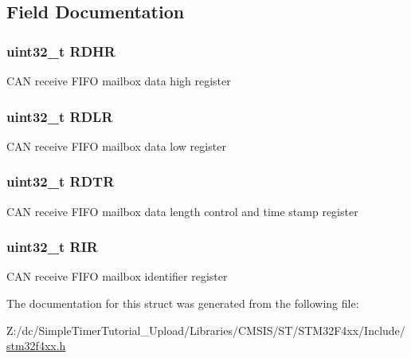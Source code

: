 \subsection{Field Documentation}
\hypertarget{struct_c_a_n___f_i_f_o_mail_box___type_def_a7f11f42ba9d3bc5cd4a4f5ea0214608e}{
\subsubsection[{R\-D\-H\-R}]{ uint32\-\_\-t R\-D\-H\-R}}\label{struct_c_a_n___f_i_f_o_mail_box___type_def_a7f11f42ba9d3bc5cd4a4f5ea0214608e}
C\-A\-N receive F\-I\-F\-O mailbox data high register \hypertarget{struct_c_a_n___f_i_f_o_mail_box___type_def_ae1c569688eedd49219cd505b9c22121b}{
\subsubsection[{R\-D\-L\-R}]{ uint32\-\_\-t R\-D\-L\-R}}\label{struct_c_a_n___f_i_f_o_mail_box___type_def_ae1c569688eedd49219cd505b9c22121b}
C\-A\-N receive F\-I\-F\-O mailbox data low register \hypertarget{struct_c_a_n___f_i_f_o_mail_box___type_def_a9563d8a88d0db403b8357331bea83a2e}{
\subsubsection[{R\-D\-T\-R}]{ uint32\-\_\-t R\-D\-T\-R}}\label{struct_c_a_n___f_i_f_o_mail_box___type_def_a9563d8a88d0db403b8357331bea83a2e}
C\-A\-N receive F\-I\-F\-O mailbox data length control and time stamp register \hypertarget{struct_c_a_n___f_i_f_o_mail_box___type_def_a0acc8eb90b17bef5b9e03c7ddaacfb0b}{
\subsubsection[{R\-I\-R}]{ uint32\-\_\-t R\-I\-R}}\label{struct_c_a_n___f_i_f_o_mail_box___type_def_a0acc8eb90b17bef5b9e03c7ddaacfb0b}
C\-A\-N receive F\-I\-F\-O mailbox identifier register 

The documentation for this struct was generated from the following file\-:\begin{DoxyCompactItemize}
\item 
Z\-:/dc/\-Simple\-Timer\-Tutorial\-\_\-\-Upload/\-Libraries/\-C\-M\-S\-I\-S/\-S\-T/\-S\-T\-M32\-F4xx/\-Include/\hyperlink{stm32f4xx_8h}{stm32f4xx.\-h}\end{DoxyCompactItemize}
